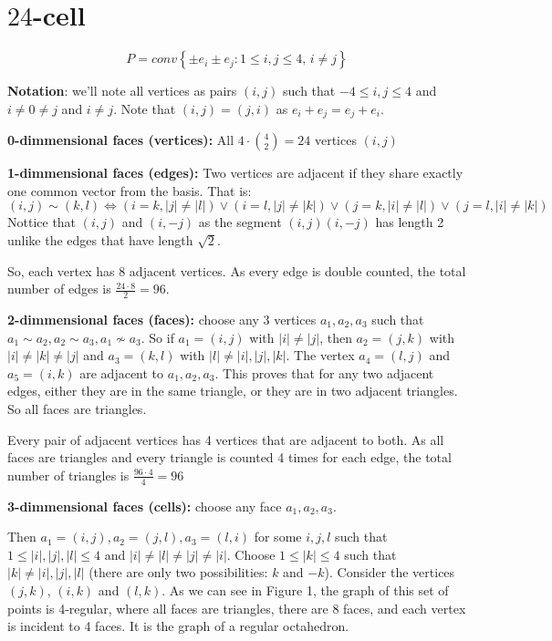 \documentclass[paper=a4, fontsize=11pt]{scrartcl} %
\theoremstyle{plain}
\begin{document}
\section{$24$-cell}

$$ P = conv\left\lbrace \pm e_i \pm e_j : 1\leq i,j\leq 4,\, i\neq j \right\rbrace$$

\textbf{Notation}: we'll note all vertices as pairs $(i,j)$ such that $ -4 \leq i,j \leq 4$ and $i \neq 0 \neq j$ and $i \neq j$. Note that $(i,j)=(j,i)$ as $e_i+e_j = e_j + e_i$.

\textbf{0-dimmensional faces (vertices):} All $4 \cdot {4 \choose 2} = 24$ vertices $(i,j)$

\textbf{1-dimmensional faces (edges):} Two vertices are adjacent if they share exactly one common vector from the basis. That is:
$$(i,j) \sim (k,l) \iff (i=k,\vert j \vert \neq \vert l \vert) \vee (i=l,\vert j \vert \neq \vert k \vert) \vee (j=k,\vert i \vert \neq \vert l \vert) \vee (j=l,\vert i \vert \neq \vert k \vert)$$
Nottice that $(i,j)$ and $(i,-j)$ as the segment $(i,j)(i,-j)$ has length 2 unlike the edges that have length $\sqrt{2}$.

So, each vertex has 8 adjacent vertices. As every edge is double counted, the total number of edges is $\frac{24 \cdot 8}{2} = 96$.

\textbf{2-dimmensional faces (faces):} choose any 3 vertices $a_1,a_2,a_3$ such that $a_1 \sim a_2, a_2 \sim a_3, a_1 \nsim a_3$.
So if $a_1 = (i,j)$ with $\vert i \vert \neq \vert j \vert$, then $a_2 = (j,k)$ with $\vert i \vert \neq \vert k \vert \neq \vert j \vert$ and $a_3 = (k,l)$ with $\vert l \vert \neq \vert i \vert, \vert j \vert, \vert k \vert$. The vertex $a_4=(l,j)$ and $a_5=(i,k)$ are adjacent to $a_1,a_2,a_3$. This proves that for any two adjacent edges, either they are in the same triangle, or they are in two adjacent triangles. So all faces are triangles.

Every pair of adjacent vertices has 4 vertices that are adjacent to both. As all faces are triangles and every triangle is counted 4 times for each edge, the total number of triangles is $\frac{96 \cdot 4}{4} = 96$ 

\textbf{3-dimmensional faces (cells):} choose any face $a_1,a_2,a_3$.

Then $a_1 = (i,j), a_2=(j,l), a_3=(l,i)$ for some $i,j,l$ such that $1 \leq \vert i \vert, \vert j \vert, \vert l \vert \leq 4$ and $\vert i \vert \neq \vert l \vert \neq \vert j \vert \neq \vert i \vert$. Choose $ 1 \leq \vert k \vert \leq 4 $ such that $\vert k \vert \neq \vert i \vert, \vert j \vert, \vert l \vert$ (there are only two possibilities: $k$ and $-k$). Consider the vertices $(j,k)$, $(i,k)$ and $(l,k)$. As we can see in Figure 1, the graph of this set of points is 4-regular, where all faces are triangles, there are 8 faces, and each vertex is incident to 4 faces. It is the graph of a regular octahedron.
\end{document}
